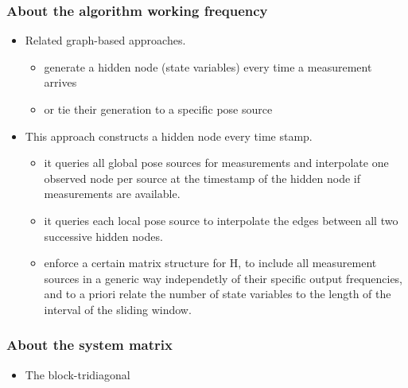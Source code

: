 \documentclass[letterpaper,11pt]{article}
\begin{document}
\subsubsection{About the algorithm working frequency}

\begin{itemize}
	\item Related graph-based approaches.
	\begin{itemize}
		\item generate a hidden node (state variables) every time a measurement arrives
		\item or tie their generation to a specific pose source
	\end{itemize}
	\item This approach constructs a hidden node every time stamp.
	\begin{itemize}
		\item it queries all global pose sources for measurements and interpolate one observed node per source at the timestamp of the hidden node if measurements are available.
		\item it queries each local pose source to interpolate the edges between all two successive hidden nodes.
		\item enforce a certain matrix structure for H, to include all measurement sources in a generic way independetly of their specific output frequencies, and to a priori relate the number of state variables to the length of the interval of the sliding window.
	\end{itemize}
\end{itemize}

\subsubsection{About the system matrix}

\begin{itemize}
	\item The block-tridiagonal 
\end{itemize}
\end{document}
